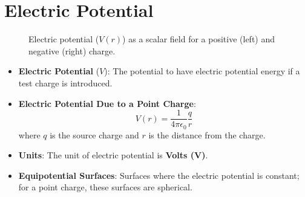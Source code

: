 \documentclass{article}
\begin{document}
\section*{Electric Potential}
\begin{figure}[h!]
    \centering


    \caption{Electric potential (\(V(r)\)) as a scalar field for a positive (left) and negative (right) charge.}
    \label{fig:potential_scalar_field}
\end{figure}

\begin{itemize}
    \item \textbf{Electric Potential} (\(V\)): The potential to have electric potential energy if a test charge is introduced.
    \item \textbf{Electric Potential Due to a Point Charge}:
    \[
    V(r) = \frac{1}{4 \pi \epsilon_0} \frac{q}{r}
    \]
    where \(q\) is the source charge and \(r\) is the distance from the charge.
    \item \textbf{Units}: The unit of electric potential is \textbf{Volts (V)}.
    \item \textbf{Equipotential Surfaces}: Surfaces where the electric potential is constant; for a point charge, these surfaces are spherical.
\end{itemize}
\end{document}
